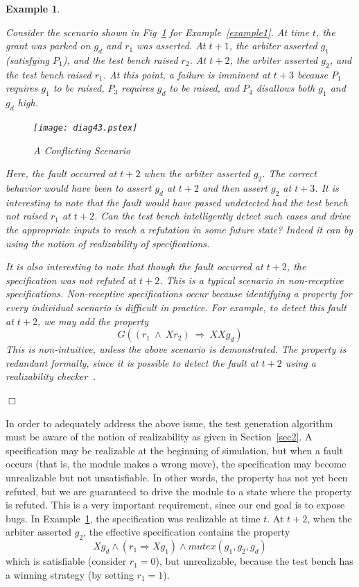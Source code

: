 \documentclass[a4paper, 11pt]{article}
\newtheorem{example}{Example} %
\begin{document}
\begin{example} \label{example3}
{\em Consider the scenario shown in Fig~\ref{timing} for 
Example~\ref{example1}.
At time $t$, the grant was parked on $g_d$ and $r_1$ was asserted.
At $t+1$, the arbiter asserted $g_1$ (satisfying $P_1$), and the test
bench raised $r_2$. At $t+2$, the arbiter asserted $g_2$, and the
test bench raised $r_1$. At this point, a failure is imminent at
$t+3$ because $P_1$ requires $g_1$ to be raised, $P_3$ requires
$g_d$ to be raised, and $P_4$ disallows both $g_1$ and $g_d$ high.

\begin{figure}[htb]
\centering
\texttt{[image: diag43.pstex]}
\caption{A Conflicting Scenario} \label{timing}
\end{figure}

Here, the fault occurred at $t+2$ when the arbiter asserted
$g_2$. The correct behavior would have been to assert $g_d$ at
$t+2$ and then assert $g_2$ at $t+3$.
It is interesting to note that the fault would have passed undetected
had the test bench not raised $r_1$ at $t+2$. {\em Can the test
bench intelligently detect such cases and drive the appropriate
inputs to reach a refutation in some future state?} Indeed it can
by using the notion of {\em realizability} of specifications.

It is also interesting to note that though the fault occurred at $t+2$,
the specification was not refuted at $t+2$. This is a typical scenario
in {\em non-receptive}~\cite{dill} specifications. Non-receptive
specifications occur because identifying a property for every individual
scenario is  difficult in practice. For example, to detect this
fault at $t+2$, we may add the property
\[ G((r_1\ \land\ Xr_2)\ \Rightarrow\ XXg_d) \]
This is non-intuitive, unless the above scenario is
demonstrated. The property is redundant formally, since it is possible
to detect the fault at $t+2$ using a realizability checker~\cite{lily}.
}$\Box$
\end{example}

\noindent
In order to adequately address the above issue, the test generation
algorithm must be aware of the notion of realizability as given in 
Section~\ref{sec2}. A specification may be realizable
at the beginning of simulation, but when a fault occurs (that is, the
module makes a wrong move), the specification may become unrealizable but not
unsatisfiable. In other words, the property has not yet been refuted, but
we are guaranteed to drive the module to a
state where the property is refuted. This is a very important requirement,
since our end goal is to expose bugs. In Example~\ref{example3}, the
specification was realizable at time $t$. At $t+2$, when the arbiter
asserted $g_2$, the effective specification contains the property
\[ Xg_d \land (r_1 \Rightarrow  Xg_1) \land mutex(g_1, g_2, g_d) \]
which is satisfiable (consider $r_1 = 0$),
but unrealizable, because the test bench has a winning strategy
(by setting $r_1 = 1$).
\end{document}
